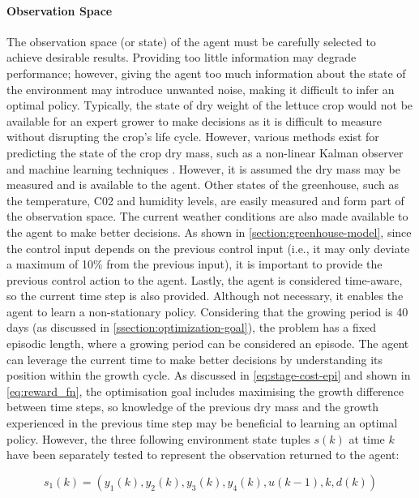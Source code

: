 \paragraph{Observation Space}
The observation space (or state) of the agent must be carefully selected to achieve desirable results. Providing too little information may degrade performance; however, giving the agent too much information about the state of the environment may introduce unwanted noise, making it difficult to infer an optimal policy. Typically, the state of dry weight of the lettuce crop would not be available for an expert grower to make decisions as it is difficult to measure without disrupting the crop’s life cycle. However, various methods exist for predicting the state of the crop dry mass, such as a non-linear Kalman observer and machine learning techniques \cite{gongDeepLearningBased2021}. However, it is assumed the dry mass may be measured and is available to the agent. Other states of the greenhouse, such as the temperature, C02 and humidity levels, are easily measured and form part of the observation space. The current weather conditions are also made available to the agent to make better decisions. As shown in \autoref{section:greenhouse-model}, since the control input depends on the previous control input (i.e., it may only deviate a maximum of 10\% from the previous input), it is important to provide the previous control action to the agent. Lastly, the agent is considered time-aware, so the current time step is also provided. Although not necessary, it enables the agent to learn a non-stationary policy. Considering that the growing period is 40 days (as discussed in \autoref{ssection:optimization-goal}), the problem has a fixed episodic length, where a growing period can be considered an episode. The agent can leverage the current time to make better decisions by understanding its position within the growth cycle. As discussed in \autoref{eq:stage-cost-epi} and shown in \autoref{eq:reward_fn}, the optimisation goal includes maximising the growth difference between time steps, so knowledge of the previous dry mass and the growth experienced in the previous time step may be beneficial to learning an optimal policy. However, the three following environment state tuples $s(k)$ at time $k$ have been separately tested to represent the observation returned to the agent:

\begin{equation}\label{eq:obs-tuple-1}
    s_1(k) = (y_1(k),y_2(k),y_3(k),y_4(k), u(k-1), k, d(k))
\end{equation}

